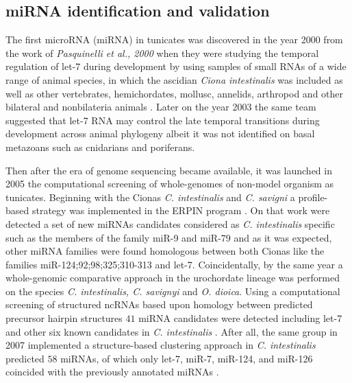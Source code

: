 \documentclass[graybox]{svmult}
\begin{document}


\subsection{miRNA identification and validation}

The first microRNA (miRNA) in tunicates was discovered in the year 2000 from 
the work of \textit{Pasquinelli et al., 2000} when they were studying 
the temporal regulation of let-7 during development by using samples of small 
RNAs of a wide range of animal species, in which the ascidian \textit{Ciona 
intestinalis} was included as well as other vertebrates, hemichordates, mollusc, 
annelids, arthropod and other bilateral and nonbilateria animals 
\cite{Pasquinelli2000}. Later on the year 2003 the same team suggested that 
let-7 RNA may control the late temporal transitions during development across 
animal phylogeny \cite{Pasquinelli2003} albeit it was not identified on basal 
metazoans such as cnidarians and poriferans. 

Then after the era of genome sequencing became available, it was launched in 
2005 the computational screening of whole-genomes of non-model organism as 
tunicates. Beginning with the Cionas \textit{C. intestinalis} and \textit{C. 
savigni} a profile-based strategy was implemented in the ERPIN program 
\cite{Legendre2005}. On that work were detected a set of new miRNAs candidates 
considered as \textit{C. intestinalis} specific such as the members of the 
family miR-9 and miR-79 and as it was expected, other miRNA families were found 
homologous between both Cionas like the families miR-124;92;98;325;310-313 and 
let-7. Coincidentally, by the same year a whole-genomic comparative approach in 
the urochordate lineage was performed on the species \textit{C. intestinalis, C. 
savignyi} and \textit{O. dioica}. Using a computational screening of structured 
ncRNAs based upon homology between predicted precursor hairpin structures  $41$ 
miRNA candidates were detected including let-7 and other six known candidates in 
\textit{C. intestinalis} \cite{Missal2005}. After all, the same group in 2007 
implemented a structure-based clustering approach in \textit{C. intestinalis} 
predicted $58$ miRNAs, of which only let-7, miR-7, miR-124, and miR-126 
coincided with the previously annotated miRNAs \cite{Will2007}. 
\end{document}
